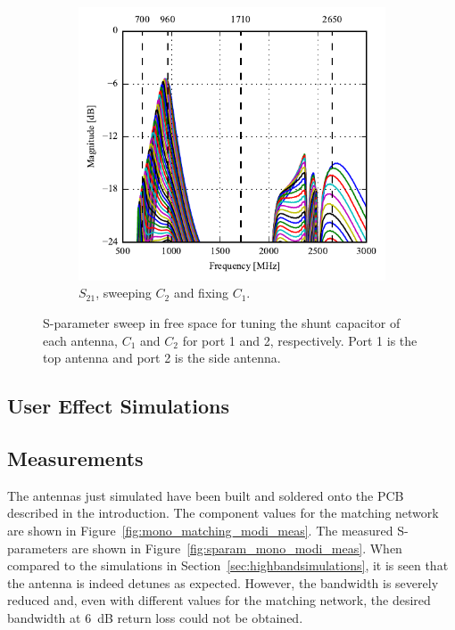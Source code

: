 \begin{figure}[htbp]
\begin{subfigure}[b]{0.49\linewidth}
    \end{subfigure}
    \hfill
    \begin{subfigure}[b]{0.49\linewidth}
        \centering
        \includegraphics{img/tech_sol/monopole/highband/sim/s22_s21.pdf}
        \caption{$S_{21}$, sweeping $C_2$ and fixing $C_1$.}
    \end{subfigure}
    \caption{S-parameter sweep in free space for tuning the shunt capacitor of each antenna, $C_1$ and $C_2$ for port 1 and 2, respectively. Port 1 is the top antenna and port 2 is the side antenna.}
    \label{fig:sparam_mono_modi_sim}
\end{figure}

\FloatBarrier
\subsection{User Effect Simulations}

\FloatBarrier
\subsection{Measurements}
The antennas just simulated have been built and soldered onto the PCB described in the introduction. The component values for the matching network are shown in Figure~\ref{fig:mono_matching_modi_meas}. The measured S-parameters are shown in Figure~\ref{fig:sparam_mono_modi_meas}. When compared to the simulations in Section~\ref{sec:highbandsimulations}, it is seen that the antenna is indeed detunes as expected. However, the bandwidth is severely reduced and, even with different values for the matching network, the desired bandwidth at \SI{6}{dB} return loss could not be obtained.

